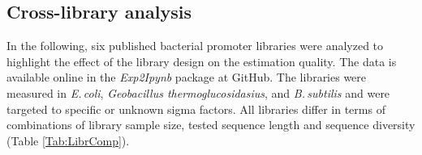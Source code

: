 \documentclass[utf8]{frontiersSCNS} %
\begin{document}


\subsection{Cross-library analysis}
In the following, six published bacterial promoter libraries were analyzed to highlight the effect of the library design on the estimation quality. The data is available online in the \textit{Exp2Ipynb} package at GitHub. The libraries were measured in \textit{E.\,coli}, \textit{Geobacillus thermoglucosidasius}, and \textit{B.\,subtilis} and were targeted to specific or unknown sigma factors. All libraries differ in terms of combinations of library sample size, tested sequence length and sequence diversity (Table \ref{Tab:LibrComp}). 
\end{document}
